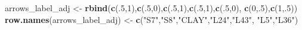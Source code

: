 \documentclass[12pt,]{book}
\newenvironment{Shaded}{\begin{snugshade}}{\end{snugshade}}
\newcommand{\DecValTok}[1]{\textcolor[rgb]{0.00,0.00,0.81}{#1}}
\newcommand{\KeywordTok}[1]{\textcolor[rgb]{0.13,0.29,0.53}{\textbf{#1}}}
\newcommand{\NormalTok}[1]{#1}
\newcommand{\StringTok}[1]{\textcolor[rgb]{0.31,0.60,0.02}{#1}}
\begin{document}
\pagebreak

\begin{Shaded}
\begin{Highlighting}[]
\NormalTok{arrows_label_adj <-}\StringTok{ }\KeywordTok{rbind}\NormalTok{(}\KeywordTok{c}\NormalTok{(.}\DecValTok{5}\NormalTok{,}\DecValTok{1}\NormalTok{),}\KeywordTok{c}\NormalTok{(.}\DecValTok{5}\NormalTok{,}\DecValTok{0}\NormalTok{),}\KeywordTok{c}\NormalTok{(.}\DecValTok{5}\NormalTok{,}\DecValTok{1}\NormalTok{),}\KeywordTok{c}\NormalTok{(.}\DecValTok{5}\NormalTok{,}\DecValTok{1}\NormalTok{),}\KeywordTok{c}\NormalTok{(.}\DecValTok{5}\NormalTok{,}\DecValTok{0}\NormalTok{),}
                          \KeywordTok{c}\NormalTok{(}\DecValTok{0}\NormalTok{,.}\DecValTok{5}\NormalTok{),}\KeywordTok{c}\NormalTok{(}\DecValTok{1}\NormalTok{,.}\DecValTok{5}\NormalTok{))}
\KeywordTok{row.names}\NormalTok{(arrows_label_adj) <-}\StringTok{ }\KeywordTok{c}\NormalTok{(}\StringTok{"S7"}\NormalTok{,}\StringTok{"S8"}\NormalTok{,}\StringTok{"CLAY"}\NormalTok{,}\StringTok{"L24"}\NormalTok{,}\StringTok{"L43"}\NormalTok{,}
                                 \StringTok{"L5"}\NormalTok{,}\StringTok{"L36"}\NormalTok{)}


\end{Highlighting}
\end{Shaded}
\end{document}
